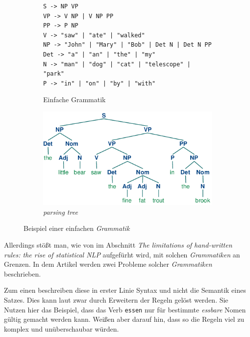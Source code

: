         \begin{figure}[H]
			\centering
            \begin{subfigure}{0.49\textwidth}
				\begin{lstlisting}
S -> NP VP
VP -> V NP | V NP PP
PP -> P NP
V -> "saw" | "ate" | "walked"
NP -> "John" | "Mary" | "Bob" | Det N | Det N PP
Det -> "a" | "an" | "the" | "my"
N -> "man" | "dog" | "cat" | "telescope" | "park"
P -> "in" | "on" | "by" | "with"
    			\end{lstlisting}
                \caption{Einfache Grammatik}
                \label{fig:grammer}
			\end{subfigure}
            \begin{subfigure}{0.49\textwidth}
            	\centering
            	\includegraphics[width=.8\linewidth]{images/grammer.png}
            	\caption{\emph{parsing tree}}
            	\label{fig:parsingTree}
            \end{subfigure}
            \label{fig:grammerWithTree}
            \caption{Beispiel einer einfachen \emph{Grammatik} \parencite[Kapitel 8]{nltk:book}}
        \end{figure}
        \newpage
        
        Allerdings stößt man, wie von \cite[S. 544]{jamia:introduction} im Abschnitt \emph{The limitations of hand-written rules: the rise of statistical NLP} aufgefürht wird, mit solchen \emph{Grammatiken} an Grenzen. In dem Artikel werden zwei Probleme solcher \emph{Grammatiken} beschrieben.
    
    	Zum einen beschreiben diese in erster Linie Syntax und nicht die Semantik eines Satzes. Dies kann laut \cite{jamia:introduction} zwar durch Erweitern der Regeln gelöst werden. Sie Nutzen hier das Beispiel, dass das Verb \texttt{essen} nur für bestimmte \emph{essbare} Nomen gültig gemacht werden kann. Weißen aber darauf hin, dass so die Regeln viel zu komplex und unüberschaubar würden.
        

